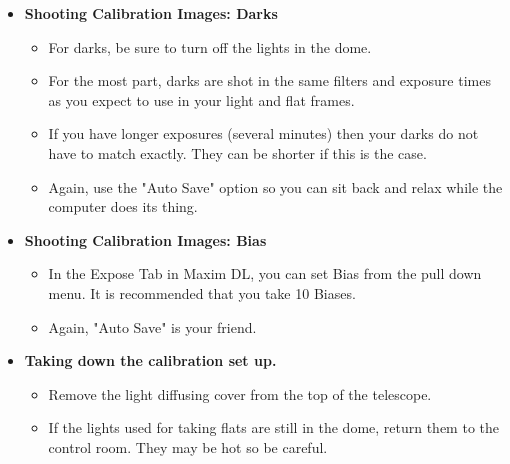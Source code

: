 \documentclass[letterpaper, 12pt]{report}
\begin{document}
	\begin{itemize}
		\item  {\large \textbf{Shooting Calibration Images: Darks}}
		\begin{itemize}
			\item For darks, be sure to turn off the lights in the dome.
			\item For the most part, darks are shot in the same filters and exposure times as you expect to use in your light and flat frames.
			\item If you have longer exposures (several minutes) then your darks do not have to match exactly. They can be shorter if this is the case.
			\item Again, use the "Auto Save" option so you can sit back and relax while the computer does its thing.
		\end{itemize}
		\item {\large \textbf{Shooting Calibration Images: Bias}}
		\begin{itemize}
			\item In the Expose Tab in Maxim DL, you can set Bias from the pull down menu. It is recommended that you take 10 Biases.
			\item Again, "Auto Save" is your friend.
		\end{itemize}
		\item {\large \textbf{Taking down the calibration set up.}}
		\begin{itemize}
			\item Remove the light diffusing cover from the top of the telescope.
			\item If the lights used for taking flats are still in the dome, return them to the control room. They may be hot so be careful.
	\end{itemize}
	
\end{itemize}
\newpage
\end{document}
